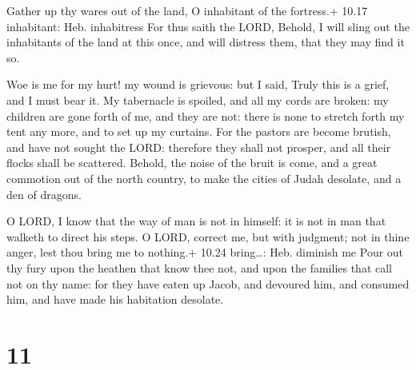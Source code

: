  Gather up thy wares out of the land, O inhabitant of the
fortress.+ 10.17 inhabitant: Heb. inhabitress  For thus
saith the LORD, Behold, I will sling out the inhabitants of the land at
this once, and will distress them, that they may find it so.

 Woe is me for my hurt! my wound is grievous: but I said,
Truly this is a grief, and I must bear it.  My tabernacle
is spoiled, and all my cords are broken: my children are gone forth of
me, and they are not: there is none to stretch forth my tent any more,
and to set up my curtains.  For the pastors are become
brutish, and have not sought the LORD: therefore they shall not prosper,
and all their flocks shall be scattered.  Behold, the noise
of the bruit is come, and a great commotion out of the north country, to
make the cities of Judah desolate, and a den of dragons.

 O LORD, I know that the way of man is not in himself: it
is not in man that walketh to direct his steps.  O LORD,
correct me, but with judgment; not in thine anger, lest thou bring me to
nothing.+ 10.24 bring\ldots: Heb. diminish me  Pour out thy
fury upon the heathen that know thee not, and upon the families that
call not on thy name: for they have eaten up Jacob, and devoured him,
and consumed him, and have made his habitation desolate.

\hypertarget{section-10}{%
\section{11}\label{section-10}}


